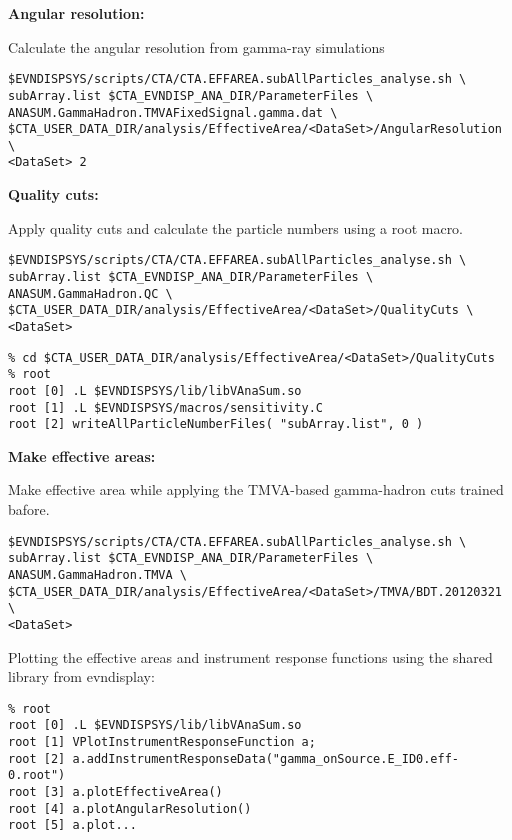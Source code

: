 \documentclass[titlepage,a4paper,twoside,11pt]{report}
\begin{document}
{\bf Angular resolution:} 

Calculate the angular resolution from gamma-ray simulations

\begin{lstlisting}
$EVNDISPSYS/scripts/CTA/CTA.EFFAREA.subAllParticles_analyse.sh \
subArray.list $CTA_EVNDISP_ANA_DIR/ParameterFiles \
ANASUM.GammaHadron.TMVAFixedSignal.gamma.dat \
$CTA_USER_DATA_DIR/analysis/EffectiveArea/<DataSet>/AngularResolution \
<DataSet> 2
\end{lstlisting}

{\bf Quality cuts:}

Apply quality cuts and calculate the particle numbers using a root macro.

\begin{lstlisting}
$EVNDISPSYS/scripts/CTA/CTA.EFFAREA.subAllParticles_analyse.sh \
subArray.list $CTA_EVNDISP_ANA_DIR/ParameterFiles \
ANASUM.GammaHadron.QC \
$CTA_USER_DATA_DIR/analysis/EffectiveArea/<DataSet>/QualityCuts \
<DataSet> 
\end{lstlisting}

\begin{lstlisting}
% cd $CTA_USER_DATA_DIR/analysis/EffectiveArea/<DataSet>/QualityCuts
% root 
root [0] .L $EVNDISPSYS/lib/libVAnaSum.so
root [1] .L $EVNDISPSYS/macros/sensitivity.C
root [2] writeAllParticleNumberFiles( "subArray.list", 0 )
\end{lstlisting}

{\bf Make effective areas:}

Make effective area while applying the TMVA-based gamma-hadron cuts
trained bafore.

\begin{lstlisting}
$EVNDISPSYS/scripts/CTA/CTA.EFFAREA.subAllParticles_analyse.sh \
subArray.list $CTA_EVNDISP_ANA_DIR/ParameterFiles \
ANASUM.GammaHadron.TMVA \
$CTA_USER_DATA_DIR/analysis/EffectiveArea/<DataSet>/TMVA/BDT.20120321 \
<DataSet> 
\end{lstlisting}

Plotting the effective areas and instrument response functions using
the shared library from evndisplay: 

\begin{lstlisting}
% root
root [0] .L $EVNDISPSYS/lib/libVAnaSum.so
root [1] VPlotInstrumentResponseFunction a;
root [2] a.addInstrumentResponseData("gamma_onSource.E_ID0.eff-0.root")
root [3] a.plotEffectiveArea()
root [4] a.plotAngularResolution()
root [5] a.plot...
\end{lstlisting}
\end{document}
